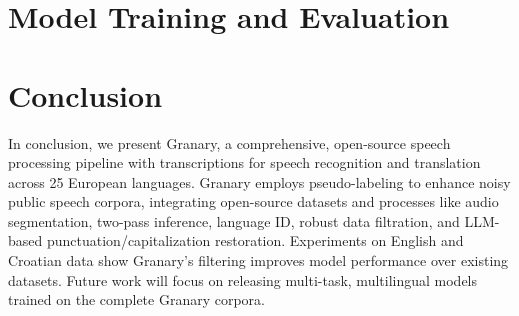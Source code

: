 \documentclass{Interspeech}
\begin{document}
\section{Model Training and Evaluation}





\section{Conclusion}

In conclusion, we present Granary, a comprehensive, open-source speech processing pipeline with transcriptions for speech recognition and translation across 25 European languages. Granary employs pseudo-labeling to enhance noisy public speech corpora, integrating open-source datasets and processes like audio segmentation, two-pass inference, language ID, robust data filtration, and LLM-based punctuation/capitalization restoration. Experiments on English and Croatian data show Granary's filtering improves model performance over existing datasets. Future work will focus on releasing multi-task, multilingual models trained on the complete Granary corpora.

\newpage



\end{document}
